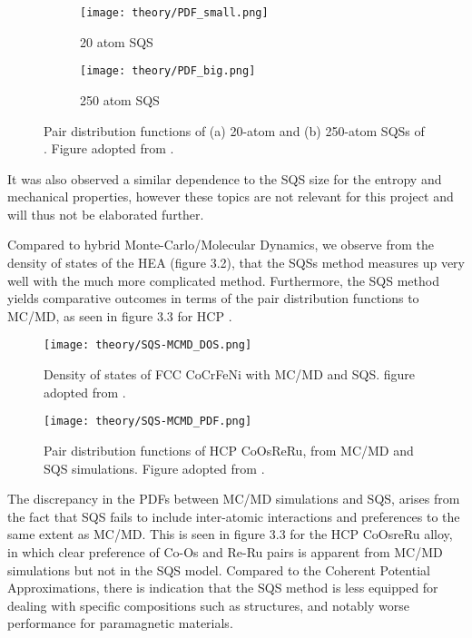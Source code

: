 \begin{figure}[H]
\begin{subfigure}{.5\textwidth}
\texttt{[image: theory/PDF\_small.png]}
\caption{20 atom SQS}	
\end{subfigure}
\begin{subfigure}{.5\textwidth}
\texttt{[image: theory/PDF\_big.png]}
\caption{250 atom SQS}
\end{subfigure}
\caption{Pair distribution functions of (a) 20-atom and (b) 250-atom SQSs of . Figure adopted from \cite{hea2016_ch10}.}
\end{figure}
     
It was also observed a similar dependence to the SQS size for the entropy and mechanical properties, however these topics are not relevant for this project and will thus not be elaborated further. 

Compared to hybrid Monte-Carlo/Molecular Dynamics, we observe from the density of states of the  HEA (figure 3.2), that the SQSs method measures up very well with the much more complicated method. Furthermore, the SQS method yields  comparative outcomes in terms of the pair distribution functions to MC/MD, as seen in figure 3.3 for HCP .  
      
\begin{figure}[H]
\centering
\texttt{[image: theory/SQS-MCMD\_DOS.png]}
\caption{Density of states of FCC CoCrFeNi with MC/MD and SQS. figure adopted from \cite{hea2016_ch10}.}
\end{figure}

\begin{figure}[H]
\centering
\texttt{[image: theory/SQS-MCMD\_PDF.png]}
\caption{Pair distribution functions of HCP CoOsReRu, from MC/MD and SQS simulations. Figure adopted from \cite{hea2016_ch10}.}
\end{figure}

The discrepancy in the PDFs between MC/MD simulations and SQS, arises from the fact that SQS fails to include inter-atomic interactions and preferences to the same extent as MC/MD. This is seen in figure 3.3 for the HCP CoOsreRu alloy, in which clear preference of Co-Os and Re-Ru pairs is apparent from MC/MD simulations but not in the SQS model. Compared to the Coherent Potential Approximations, there is indication that the SQS method is less equipped for dealing with specific compositions such as  structures, and notably worse performance for paramagnetic materials. 

